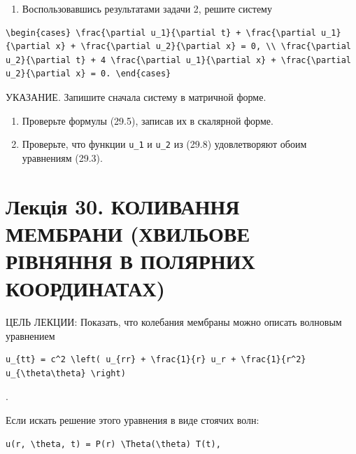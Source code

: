 \documentclass[
  ukrainian,
]{article}
\providecommand{\tightlist}{%
  \setlength{\itemsep}{0pt}\setlength{\parskip}{0pt}}
\begin{document}
\begin{enumerate}
\def\labelenumi{\arabic{enumi}.}
\setcounter{enumi}{2}
\tightlist
\item
  Воспользовавшись результатами задачи 2, решите систему
\end{enumerate}

\begin{verbatim}
\begin{cases} \frac{\partial u_1}{\partial t} + \frac{\partial u_1}{\partial x} + \frac{\partial u_2}{\partial x} = 0, \\ \frac{\partial u_2}{\partial t} + 4 \frac{\partial u_1}{\partial x} + \frac{\partial u_2}{\partial x} = 0. \end{cases}
\end{verbatim}

УКАЗАНИЕ. Запишите сначала систему в матричной форме.

\begin{enumerate}
\def\labelenumi{\arabic{enumi}.}
\setcounter{enumi}{3}
\item
  Проверьте формулы (29.5), записав их в скалярной форме.
\item
  Проверьте, что функции \texttt{u\_1} и \texttt{u\_2} из (29.8)
  удовлетворяют обоим уравнениям (29.3).
\end{enumerate}

\section{Лекція 30. КОЛИВАННЯ МЕМБРАНИ (ХВИЛЬОВЕ РІВНЯННЯ В ПОЛЯРНИХ
КООРДИНАТАХ)}\label{ux43bux435ux43aux446ux456ux44f-30.-ux43aux43eux43bux438ux432ux430ux43dux43dux44f-ux43cux435ux43cux431ux440ux430ux43dux438-ux445ux432ux438ux43bux44cux43eux432ux435-ux440ux456ux432ux43dux44fux43dux43dux44f-ux432-ux43fux43eux43bux44fux440ux43dux438ux445-ux43aux43eux43eux440ux434ux438ux43dux430ux442ux430ux445}

ЦЕЛЬ ЛЕКЦИИ: Показать, что колебания мембраны можно описать волновым
уравнением

\begin{verbatim}
u_{tt} = c^2 \left( u_{rr} + \frac{1}{r} u_r + \frac{1}{r^2} u_{\theta\theta} \right)
\end{verbatim}

.

Если искать решение этого уравнения в виде стоячих волн:

\begin{verbatim}
u(r, \theta, t) = P(r) \Theta(\theta) T(t),
\end{verbatim}
\end{document}
